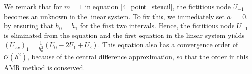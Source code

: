 We remark that for $m=1$ in equation \eqref{4_point_stencil}, the fictitious node $U_{-1}$ becomes an unknown in the linear system. To fix this, we immediately set $a_1 = 0$, by ensuring that $h_0 = h_1$ for the first two intervals. Hence, the fictitious node $U_{-1}$ is eliminated from the equation and the first equation in the linear system yields $(U_{xx})_1=\frac{1}{h_0^2}(U_0-2U_1+U_2)$. This equation also has a convergence order of $\mathcal{O}(h^2)$, because of the central difference approximation, so that the order in this AMR method is conserved.

